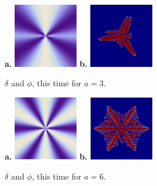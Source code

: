 \documentclass[10pt]{article} %
\begin{document}
\begin{figure}[h!]
  \centering
  \textbf{a. }\includegraphics[width=0.25\textwidth]{../radial-anisotropy-3.png}
  \hspace{1cm}\textbf{b. }\includegraphics[width=0.25\textwidth]{../anis-3.png}
  \caption{$\delta$ and $\phi$, this time for $a=3$.}
  \label{fig:r-delta-3}
\end{figure}

\begin{figure}[h!]
  \centering
  \textbf{a. }\includegraphics[width=0.25\textwidth]{../radial-anisotropy-6.png}
  \hspace{1cm}\textbf{b. }\includegraphics[width=0.25\textwidth]{../anis-6.png}
  \caption{$\delta$ and $\phi$, this time for $a=6$.}
  \label{fig:r-delta-6}
\end{figure}
\end{document}
